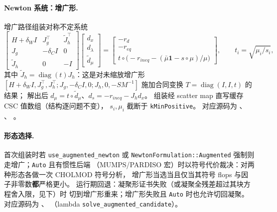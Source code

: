 \paragraph{Newton 系统：增广形.}
增广路径组装对称不定系统
\begin{equation}
  \begin{bmatrix}
    H + \delta_W I & J_g^{\top} & \tilde J_h^{\top}\\
    J_g & -\delta_C I & 0\\
    \tilde J_h & 0 & -I
  \end{bmatrix}
  \begin{bmatrix} d_x \\ d_\lambda \\ \tilde d_\mu \end{bmatrix}
  =
  \begin{bmatrix} -r_d \\ -r_{eq} \\
    t \circ \bigl(-r_{ineq} - (\bar\mu\mathbf{1} - s\circ\mu)/\mu\bigr)
  \end{bmatrix},
  \qquad t_i = \sqrt{\mu_i / s_i},
  \label{eq:ipm:augmented}
\end{equation}
其中 $\tilde J_h = \operatorname{diag}(t) J_h$：这是对未缩放增广形
$[H+\delta_W I, J_g^{\top}, J_h^{\top}; J_g, -\delta_C I, 0;
J_h, 0, -S M^{-1}]$ 施加合同变换 $T = \operatorname{diag}(I, I, t)$ 的结果；
解出后 $d_\mu = t \circ \tilde d_\mu$、$d_s = -r_{ineq} - J_h d_x$。
组装经 scatter map 直写缓存 CSC 值数组（结构逐问题不变），
$s_i, \mu_i$ 截断于 \texttt{kMinPositive}。
对应源码为 、
、
。

\paragraph{形态选择.}
首次组装时若 \texttt{use\_augmented\_newton} 或
\texttt{NewtonFormulation::Augmented} 强制则走增广；\texttt{Auto} 且有惯性后端
（MUMPS/PARDISO 宏）时以符号代价裁决：对两种形态各做一次 CHOLMOD 符号分析，
增广形当选当且仅当其符号 flops 与因子非零数\textbf{都}严格更小。
运行期回退：凝聚形证书失败（或凝聚全残差超过其块方程舍入限，见下）时
切到增广形重来；增广形失败且 \texttt{Auto} 时也允许切回凝聚。
对应源码为 、
（lambda \texttt{solve\_augmented\_candidate}）。

